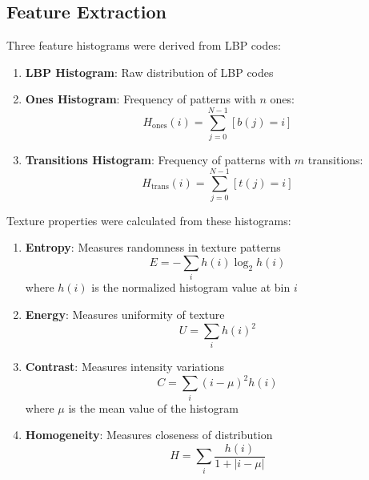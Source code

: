 \documentclass[a4paper,12pt]{report}
\begin{document}
\subsection{Feature Extraction}
\label{subsec:feature_extraction}

Three feature histograms were derived from LBP codes:

\begin{enumerate}
    \item \textbf{LBP Histogram}: Raw distribution of LBP codes
    
    \item \textbf{Ones Histogram}: Frequency of patterns with $n$ ones:
    \begin{equation}
    H_{\text{ones}}(i) = \sum_{j=0}^{N-1} [b(j) = i]
    \end{equation}
    
    \item \textbf{Transitions Histogram}: Frequency of patterns with $m$ transitions:
    \begin{equation}
    H_{\text{trans}}(i) = \sum_{j=0}^{N-1} [t(j) = i]
    \end{equation}
\end{enumerate}

Texture properties were calculated from these histograms:

\begin{enumerate}
    \item \textbf{Entropy}: Measures randomness in texture patterns
    \begin{equation}
    E = -\sum_{i} h(i) \log_2 h(i)
    \end{equation}
    where $h(i)$ is the normalized histogram value at bin $i$
    
    \item \textbf{Energy}: Measures uniformity of texture
    \begin{equation}
    U = \sum_{i} h(i)^2
    \end{equation}
    
    \item \textbf{Contrast}: Measures intensity variations
    \begin{equation}
    C = \sum_{i} (i - \mu)^2 h(i)
    \end{equation}
    where $\mu$ is the mean value of the histogram
    
    \item \textbf{Homogeneity}: Measures closeness of distribution
    \begin{equation}
    H = \sum_{i} \frac{h(i)}{1 + |i - \mu|}
    \end{equation}
\end{enumerate}
\end{document}
